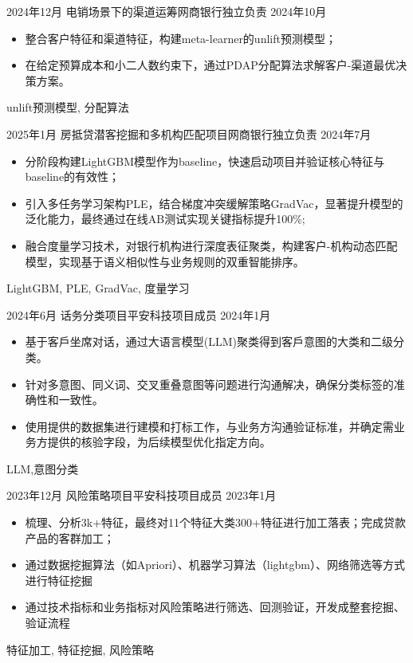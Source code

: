 \begin{experiences}
  \emptySeparator
  \experience
  {2024年12月} {电销场景下的渠道运筹}{网商银行}{独立负责}
  {2024年10月}    {
  	\begin{itemize}
  		\item  整合客户特征和渠道特征，构建meta-learner的unlift预测模型；
  		\item  在给定预算成本和小二人数约束下，通过PDAP分配算法求解客户-渠道最优决策方案。
  	\end{itemize}
  }
  {unlift预测模型, 分配算法}
  	
  \emptySeparator
  \experience
  {2025年1月} {房抵贷潜客挖掘和多机构匹配项目}{网商银行}{独立负责}
  {2024年7月 }    {
				  	\begin{itemize}
				  		\item  分阶段构建LightGBM模型作为baseline，快速启动项目并验证核心特征与baseline的有效性；
				  		\item  引入多任务学习架构PLE，结合梯度冲突缓解策略GradVac，显著提升模型的泛化能力，最终通过在线AB测试实现关键指标提升100\%;
				  		\item  融合度量学习技术，对银行机构进行深度表征聚类，构建客户-机构动态匹配模型，实现基于语义相似性与业务规则的双重智能排序。
				  	\end{itemize}
				  }
				  {LightGBM, PLE, GradVac, 度量学习}

  \emptySeparator
  \experience
  {2024年6月} {话务分类项目}{平安科技}{项目成员}
  {2024年1月}    {
				  	\begin{itemize}
				  		\item 基于客戶坐席对话，通过大语言模型(LLM)聚类得到客戶意图的大类和二级分类。           
				  		\item 针对多意图、同义词、交叉重叠意图等问题进行沟通解决，确保分类标签的准确性和一致性。 
				  		\item 使用提供的数据集进行建模和打标工作，与业务方沟通验证标准，并确定需业务方提供的核验字段，为后续模型优化指定方向。 
				  	\end{itemize}
				  }
				  {LLM,意图分类}

	\emptySeparator
  \experience
  {2023年12月} {风险策略项目}{平安科技}{项目成员}
  {2023年1月}    {
				  	\begin{itemize}
				  		\item 梳理、分析3k+特征，最终对11个特征大类300+特征进行加工落表；完成贷款产品的客群加工；                        
				  		\item 通过数据挖掘算法（如Apriori）、机器学习算法（lightgbm）、网络筛选等方式进行特征挖掘
				  		\item 通过技术指标和业务指标对风险策略进行筛选、回测验证，开发成整套挖掘、验证流程
				  	\end{itemize}
				  }
				  {特征加工, 特征挖掘, 风险策略}
		  				  

\end{experiences}

